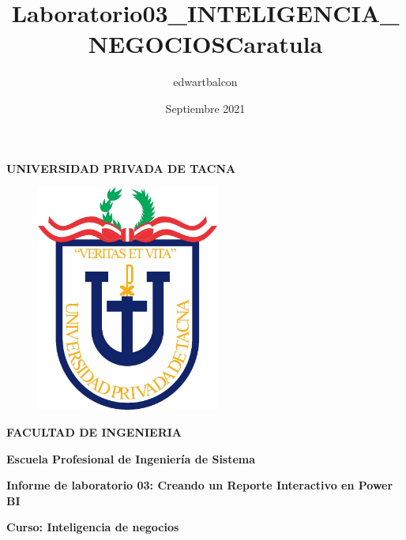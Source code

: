 \documentclass{article}
\title{Laboratorio03_INTELIGENCIA_NEGOCIOS}
\author{edwartbalcon}
\date{Septiembre 2021}
\begin{document}
\title{Caratula}

\begin{titlepage}
\begin{center}
\begin{Large}
\textbf{UNIVERSIDAD PRIVADA DE TACNA} \\
\end{Large}
\vspace*{-0.025in}
\begin{figure}[htb]
\begin{center}
\includegraphics[width=6cm]{./images/logo_UPT}
\end{center}
\end{figure}
\vspace*{-0.025in}
\begin{Large}
\textbf{FACULTAD DE INGENIERIA} \\
\end{Large}
\vspace*{0.05in}
\begin{Large}
\textbf{Escuela Profesional de Ingeniería de Sistema} \\
\end{Large}


\vspace*{0.4in}

\vspace*{0.1in}
\begin{Large}
\textbf{Informe de laboratorio 03: Creando un Reporte Interactivo en Power BI} \\
\end{Large}

\vspace*{0.3in}
\begin{Large}
\textbf{Curso: Inteligencia de negocios} \\
\end{Large}


\end{center}
\end{titlepage}
\end{document}
